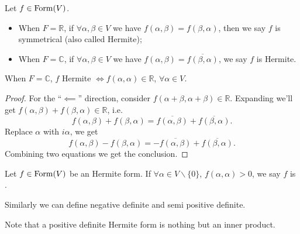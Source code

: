 \begin{definition}
	Let $f\in \operatorname{Form}(V)$.
	\begin{itemize}
		\item When $F = \mathbb{R}$, if $\forall \alpha, \beta \in V$ we have
			$f(\alpha, \beta) = f(\beta, \alpha)$, then we say $f$ is symmetrical
			(also called Hermite);
		\item When $F = \mathbb{C}$, if $\forall \alpha, \beta \in V$ we have
			$f(\alpha, \beta) = \overline{f(\beta, \alpha)}$, we say $f$ is Hermite.
	\end{itemize}
\end{definition}
\begin{proposition}
	When $F = \mathbb{C}$, $f$ Hermite $\iff f(\alpha, \alpha) \in \mathbb{R}$,
	$\forall \alpha\in V$.
\end{proposition}
\begin{proof}[Proof]
    For the ``$\impliedby$'' direction,
	consider $f(\alpha + \beta, \alpha + \beta)\in \mathbb{R}$.
	Expanding we'll get $f(\alpha, \beta)+f(\beta, \alpha) \in \mathbb{R}$, i.e.
	\[
	f(\alpha, \beta) + f(\beta, \alpha) = \overline{f(\alpha, \beta)} +
	\overline{f(\beta, \alpha)}.
	\]
	Replace $\alpha$ with $i\alpha$, we get
	\[
	f(\alpha, \beta) - f(\beta, \alpha) = -\overline{f(\alpha, \beta)} +
	\overline{f(\beta, \alpha)}.
	\]
	Combining two equations we get the conclusion.
\end{proof}

\begin{definition}
	Let $f\in \operatorname{Form}(V)$ be an Hermite form.
	If $\forall \alpha \in V \backslash\{0\}$, $f(\alpha, \alpha) > 0$,
	we say $f$ is .

	Similarly we can define negative definite and semi positive definite.
\end{definition}
Note that a positive definite Hermite form is nothing but an inner product.

